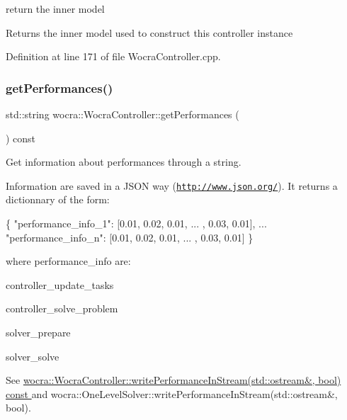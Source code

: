 return the inner model

\begin{DoxyReturn}{Returns}
the inner model used to construct this controller instance 
\end{DoxyReturn}


Definition at line 171 of file Wocra\+Controller.\+cpp.

\hypertarget{classwocra_1_1WocraController_a4023613cae33e5f490babbc6d162204d}{}\label{classwocra_1_1WocraController_a4023613cae33e5f490babbc6d162204d} 
\subsubsection{\texorpdfstring{get\+Performances()}{getPerformances()}}
{\footnotesize\ttfamily std\+::string wocra\+::\+Wocra\+Controller\+::get\+Performances (\begin{DoxyParamCaption}{ }\end{DoxyParamCaption}) const}

Get information about performances through a string.

Information are saved in a J\+S\+ON way (\href{http://www.json.org/}{\tt http\+://www.\+json.\+org/}). It returns a dictionnary of the form\+:


\begin{DoxyCode}
\{
   \textcolor{stringliteral}{"performance\_info\_1"}: [0.01, 0.02, 0.01, ... , 0.03, 0.01],
   ...
   \textcolor{stringliteral}{"performance\_info\_n"}: [0.01, 0.02, 0.01, ... , 0.03, 0.01]
\}
\end{DoxyCode}


where performance\+\_\+info are\+:


\begin{DoxyItemize}
\item controller\+\_\+update\+\_\+tasks
\item controller\+\_\+solve\+\_\+problem
\item solver\+\_\+prepare
\item solver\+\_\+solve
\end{DoxyItemize}

See \hyperlink{classwocra_1_1WocraController_a9b296a995ba10ef66cc4416f34f4b675}{wocra\+::\+Wocra\+Controller\+::write\+Performance\+In\+Stream(std\+::ostream\&, bool) const }and wocra\+::\+One\+Level\+Solver\+::write\+Performance\+In\+Stream(std\+::ostream\&, bool). 

